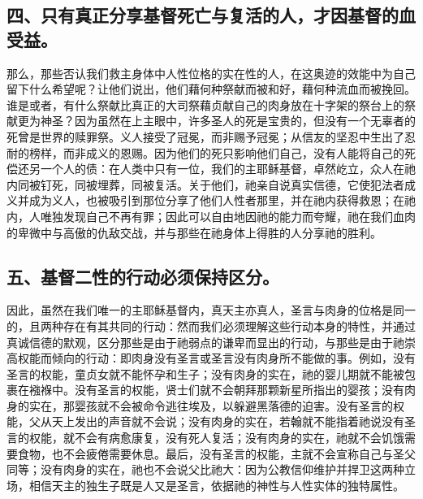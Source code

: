 
\subsection{四、只有真正分享基督死亡与复活的人，才因基督的血受益。}

那么，那些否认我们救主身体中人性位格的实在性的人，在这奥迹的效能中为自己留下什么希望呢？让他们说出，他们藉何种祭献而被和好，藉何种流血而被挽回。谁是或者，有什么祭献比真正的大司祭藉贞献自己的肉身放在十字架的祭台上的祭献更为神圣？因为虽然在上主眼中，许多圣人的死是宝贵的，但没有一个无辜者的死曾是世界的赎罪祭。义人接受了冠冕，而非赐予冠冕；从信友的坚忍中生出了忍耐的榜样，而非成义的恩赐。因为他们的死只影响他们自己，没有人能将自己的死偿还另一个人的债：在人类中只有一位，我们的主耶稣基督，卓然屹立，众人在祂内同被钉死，同被埋葬，同被复活。关于他们，祂亲自说真实信德，它使犯法者成义并成为义人，也被吸引到那位分享了他们人性者那里，并在祂内获得救恩；在祂内，人唯独发现自己不再有罪；因此可以自由地因祂的能力而夸耀，祂在我们血肉的卑微中与高傲的仇敌交战，并与那些在祂身体上得胜的人分享祂的胜利。\par


\subsection{五、基督二性的行动必须保持区分。}

因此，虽然在我们唯一的主耶稣基督内，真天主亦真人，圣言与肉身的位格是同一的，且两种存在有其共同的行动：然而我们必须理解这些行动本身的特性，并通过真诚信德的默观，区分那些是由于祂弱点的谦卑而显出的行动，与那些是由于祂崇高权能而倾向的行动：即肉身没有圣言或圣言没有肉身所不能做的事。例如，没有圣言的权能，童贞女就不能怀孕和生子；没有肉身的实在，祂的婴儿期就不能被包裹在襁褓中。没有圣言的权能，贤士们就不会朝拜那颗新星所指出的婴孩；没有肉身的实在，那婴孩就不会被命令逃往埃及，以躲避黑落德的迫害。没有圣言的权能，父从天上发出的声音就不会说；没有肉身的实在，若翰就不能指着祂说没有圣言的权能，就不会有病愈康复，没有死人复活；没有肉身的实在，祂就不会饥饿需要食物，也不会疲倦需要休息。最后，没有圣言的权能，主就不会宣称自己与圣父同等；没有肉身的实在，祂也不会说父比祂大：因为公教信仰维护并捍卫这两种立场，相信天主的独生子既是人又是圣言，依据祂的神性与人性实体的独特属性。\par

